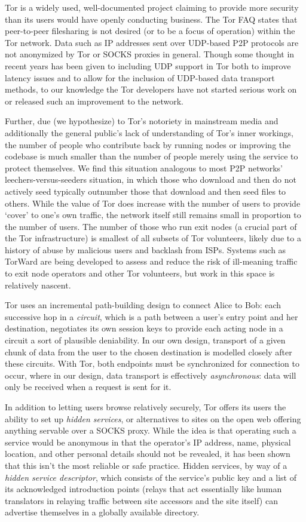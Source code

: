 Tor is a widely used, well-documented project claiming to provide more security than its users would have openly
conducting business. The Tor FAQ states that peer-to-peer filesharing is not desired (or to be a focus of operation)
within the Tor network. Data such as IP addresses sent over UDP-based P2P protocols are not anonymized by Tor or
SOCKS proxies in general. Though some thought in recent years has been given to including UDP support in Tor both
to improve latency issues and to allow for the inclusion of UDP-based data transport methods, to
our knowledge the Tor developers have not started serious work on or released such an improvement to the network.

Further, due (we hypothesize) to Tor's notoriety in mainstream media and additionally the general public's lack of
understanding of Tor's inner workings, the number of people who contribute back by running nodes
or improving the codebase is much smaller than the number of people merely using the service to protect themselves.
We find this situation analogous to most P2P networks' leechers-versus-seeders situation, in which those who download
and then do not actively seed typically outnumber those that download and then seed files to others.
While the value of Tor does increase with the number of users to provide `cover' to one's
own traffic, the network itself still remains small in proportion to the number of users.
The number of those who run exit nodes (a crucial part of the Tor infrastructure) is smallest of all subsets of Tor
volunteers, likely due to a history of abuse by malicious users and backlash from ISPs.
Systems such as TorWard are being developed to assess and reduce the
risk of ill-meaning traffic to exit node operators and other Tor
volunteers, but work in this space is relatively nascent.

Tor uses an incremental path-building design to connect Alice to Bob:
each successive hop in a \textit{circuit}, which is a path between a user's entry
point and her destination, negotiates its own session keys to provide each acting node in a circuit a sort of plausible
deniability. In our own design, transport of a given chunk of data from
the user to the chosen destination is modelled closely
after these circuits. With Tor, both endpoints must be synchronized for connection to occur, where in our design, data transport
is effectively \textit{asynchronous}: data will only be received when a request is sent for it.

In addition to letting users browse relatively securely,
Tor offers its users the ability to set up \textit{hidden services}, or alternatives to sites on the open web offering anything
servable over a SOCKS proxy. While the idea is that operating such a service would be anonymous in that the operator's
IP address, name, physical location, and other personal details should not be revealed, it has been shown that this isn't
the most reliable or safe practice. Hidden services, by way of a \textit{hidden service descriptor},
which consists of the service's public key and a list of its
acknowledged introduction points (relays that act essentially like human translators in relaying traffic between site
accessors and the site itself) can advertise themselves in a globally available directory.

